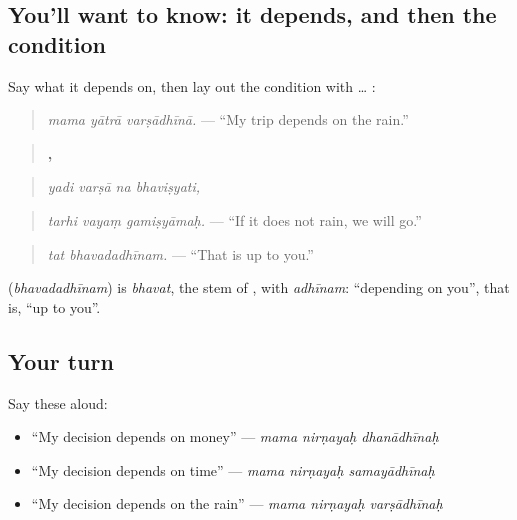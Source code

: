 \subsection*{You'll want to know: it depends, and then the condition}
Say what it depends on, then lay out the condition with \textbf{} … \textbf{}:

\begin{quote}
\textbf{  }
\end{quote}

\begin{quote}
\emph{mama yātrā varṣādhīnā.} — \textquotedblleft{}My trip depends on the rain.\textquotedblright{}
\end{quote}

\begin{quote}
\textbf{   ,}
\end{quote}

\begin{quote}
\emph{yadi varṣā na bhaviṣyati,}
\end{quote}

\begin{quote}
\textbf{  }
\end{quote}

\begin{quote}
\emph{tarhi vayaṃ gamiṣyāmaḥ.} — \textquotedblleft{}If it does not rain, we will go.\textquotedblright{}
\end{quote}

\begin{quote}
\textbf{ }
\end{quote}

\begin{quote}
\emph{tat bhavadadhīnam.} — \textquotedblleft{}That is up to you.\textquotedblright{}
\end{quote}

\textbf{} (\emph{bhavadadhīnam}) is \emph{bhavat}, the stem of \textbf{}, with \emph{adhīnam}: \textquotedblleft{}depending on you\textquotedblright{}, that is, \textquotedblleft{}up to you\textquotedblright{}.

\subsection*{Your turn}
Say these aloud:

\begin{itemize}
\raggedright
  \item \textquotedblleft{}My decision depends on money\textquotedblright{} — \emph{mama nirṇayaḥ dhanādhīnaḥ}
  \item \textquotedblleft{}My decision depends on time\textquotedblright{} — \emph{mama nirṇayaḥ samayādhīnaḥ}
  \item \textquotedblleft{}My decision depends on the rain\textquotedblright{} — \emph{mama nirṇayaḥ varṣādhīnaḥ}
\end{itemize}

